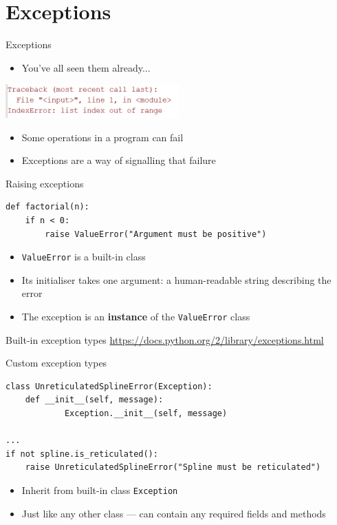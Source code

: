 \part{Exceptions}
\frame{\partpage}

\begin{frame}{Exceptions}
	\begin{itemize}
		\pause\item You've all seen them already...
	\end{itemize}
	\begin{center}
		\pause\includegraphics[width=0.5\textwidth]{exception}
	\end{center}
	\begin{itemize}
		\pause\item Some operations in a program can fail
		\pause\item Exceptions are a way of signalling that failure
	\end{itemize}
\end{frame}

\begin{frame}[fragile]{Raising exceptions}
	\pause
	\begin{lstlisting}
def factorial(n):
    if n < 0:
        raise ValueError("Argument must be positive")
	\end{lstlisting}
	\begin{itemize}
		\pause\item \lstinline{ValueError} is a built-in class
		\pause\item Its initialiser takes one argument: a human-readable
			string describing the error
		\pause\item The exception is an \textbf{instance} of the
			\lstinline{ValueError} class
	\end{itemize}
\end{frame}

\begin{frame}{Built-in exception types}
	\footnotesize\url{https://docs.python.org/2/library/exceptions.html}
\end{frame}

\begin{frame}[fragile]{Custom exception types}
	\pause
	\begin{lstlisting}
class UnreticulatedSplineError(Exception):
    def __init__(self, message):
		    Exception.__init__(self, message)

...
if not spline.is_reticulated():
    raise UnreticulatedSplineError("Spline must be reticulated")
	\end{lstlisting}
	\begin{itemize}
		\pause\item Inherit from built-in class \lstinline{Exception}
		\pause\item Just like any other class --- can contain any required
			fields and methods
	\end{itemize}
\end{frame}

